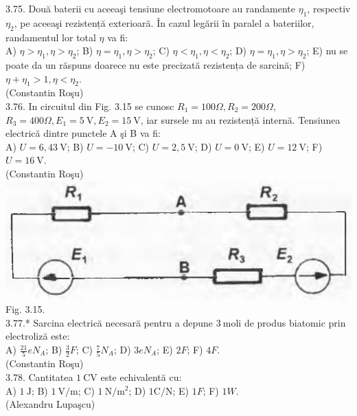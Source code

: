 \documentclass[10pt]{article}
\begin{document}
3.75. Două baterii cu aceeaşi tensiune electromotoare au randamente $\eta_{1}$, respectiv $\eta_{2}$, pe aceeaşi rezistență exterioară. În cazul legării în paralel a bateriilor, randamentul lor total $\eta$ va fi:\\ A) $\eta>\eta_{1} , \eta>\eta_{2}$; B) $\eta=\eta_{1} , \eta>\eta_{2}$; C) $\eta<\eta_{1} , \eta<\eta_{2}$; D) $\eta=\eta_{1} , \eta>\eta_{2}$; E) nu se poate da un răspuns doarece nu este precizată rezistența de sarcină; F) $\eta+\eta_{1}>1 , \eta<\eta_{2}$.\\ (Constantin Roşu)\\

3.76. In circuitul din Fig. 3.15 se cunosc $R_{1}=100 \Omega, R_{2}=200 \Omega$, $R_{3}=400 \Omega, E_{1}=5 \mathrm{~V}, E_{2}=15 \mathrm{~V}$, iar sursele nu au rezistență internă. Tensiunea electrică dintre punctele A şi B va fi:\\ A) $U=6,43 \mathrm{~V}$; B) $U=-10 \mathrm{~V}$; C) $U=2,5 \mathrm{~V}$; D) $U=0 \mathrm{~V}$; E) $U=12 \mathrm{~V}$; F) $U=16 \mathrm{~V}$.\\ (Constantin Roşu)\\ \includegraphics[max width=\textwidth, center]{2025_07_01_5b3ff9fa0d508c8e9f17g-160} Fig. 3.15.\\

3.77.* Sarcina electrică necesară pentru a depune $3 \mathrm{~moli}$ de produs biatomic prin electroliză este:\\ A) $\frac{21}{5} e N_{A}$; B) $\frac{3}{2} F$; C) $\frac{7}{5} N_{A}$; D) $3 e N_{A}$; E) $2 F$; F) $4 F$.\\ (Constantin Roşu)\\

3.78. Cantitatea $1 \mathrm{~CV}$ este echivalentă cu:\\ A) $1 \mathrm{~J}$; B) $1 \mathrm{~V} / \mathrm{m}$; C) $1 \mathrm{~N} / \mathrm{m}^{2}$; D) $1 \mathrm{C} / \mathrm{N}$; E) $1 F$; F) $1 W$.\\ (Alexandru Lupaşcu)\\
\end{document}
